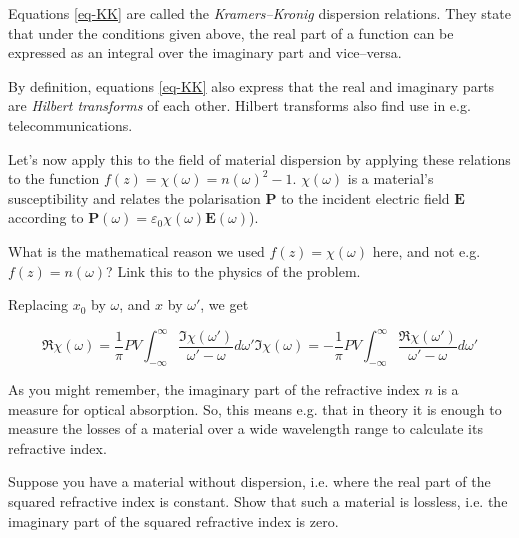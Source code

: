 Equations \ref{eq-KK} are called the \emph{Kramers--Kronig} dispersion relations. They state that under the conditions given above, the real part of a function can be expressed as an integral over the imaginary part and vice--versa.

By definition, equations \ref{eq-KK} also express that the real and imaginary parts are \emph{Hilbert transforms} of each other. Hilbert transforms also find use in e.g. telecommunications.

Let's now apply this to the field of material dispersion by applying these relations to the function $f(z) = \chi(\omega) =
n(\omega)^2 -1$. $\chi(\omega)$ is a material's susceptibility and relates the polarisation $\mathbf{P}$ to the incident electric field $\mathbf{E}$ according to $\mathbf{P}(\omega)=\varepsilon_0 \chi(\omega) \mathbf{E}(\omega)$).

\begin{exer}
What is the mathematical reason we used $f(z) = \chi(\omega)$ here, and not e.g. $f(z) = n(\omega)$? Link this to the physics of the problem. 
\end{exer}

Replacing $x_0$ by $\omega$, and $x$ by $\omega'$, we get

\begin{subequations} 
\begin{equation}
\Re \chi(\omega) = \frac{1}{\pi} PV \int_{- \infty}^{\infty} \frac{\Im
\chi(\omega')}{\omega'-\omega}d\omega'
\end{equation} 
\begin{equation}
\Im \chi(\omega) = -\frac{1}{\pi} PV \int_{- \infty}^{\infty} \frac{\Re
\chi(\omega')}{\omega'-\omega}d\omega'
\end{equation}
\label{eq-KK-2}
\end{subequations}

As you might remember, the imaginary part of the refractive index $n$ is a measure for optical absorption. So, this means e.g. that in theory it is enough to measure the losses of a material over a wide wavelength range to calculate its refractive index.

\begin{exer}
Suppose you have a material without dispersion, i.e. where the real part of the squared refractive index is constant. Show that such a material is lossless, i.e. the imaginary part of the squared refractive index is zero.
\end{exer}

